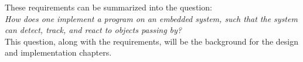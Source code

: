 These requirements can be summarized into the question: \\

\textit{How does one implement a program on an embedded system, such that the system can detect, track, and react to objects passing by?}\\

This question, along with the requirements, will be the background for the design and implementation chapters.



